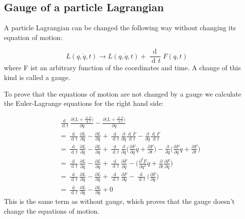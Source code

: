 \documentclass{article}
\DeclareMathOperator{\dd}{d\!}
\begin{document}
\subsection{Gauge of a particle Lagrangian}
A particle Lagrangian can be changed the following way without changing its equation of motion:

\begin{equation}
  L(q,\dot{q}, t) \rightarrow L(q,\dot{q}, t) + \frac{\dd}{ \dd t} F(q,t)
\end{equation}
where F ist an arbitrary function of the coordinates and time.
A change of this kind is called a gauge.

To prove that the equations of motion are not changed by a gauge we calculate the Euler-Lagrange equations for the right hand side:

\begin{align}
  & \frac{\dd}{\dd t} \frac{\partial \big(L + \frac{\dd F}{\dd t}\big)}{\partial \dot{q}} - \frac{\partial \big(L + \frac{\dd F}{\dd t}\big)}{\partial q} \nonumber \\
  & = \frac{\dd}{\dd t} \frac{\partial L}{\partial \dot{q}} - \frac{\partial L }{\partial q}
  + \frac{\dd}{\dd t} \frac{\partial}{\partial \dot{q}} \frac{\dd F}{\dd t}  - \frac{\partial}{\partial q} \frac{\dd F}{\dd t} \nonumber \\
  & = \frac{\dd}{\dd t} \frac{\partial L}{\partial \dot{q}} - \frac{\partial L }{\partial q}
  + \frac{\dd}{\dd t} \frac{\partial}{\partial \dot{q}} \bigg( \frac{\partial F}{\partial q} \dot{q} + \frac{\partial F}{\partial t} \bigg)
  - \frac{\partial}{\partial q} \bigg( \frac{\partial F}{\partial q} \dot{q} + \frac{\partial F}{\partial t} \bigg) \nonumber \\
  & = \frac{\dd}{\dd t} \frac{\partial L}{\partial \dot{q}} - \frac{\partial L }{\partial q}
  + \frac{\dd}{\dd t} \frac{\partial F}{\partial q}
  - \bigg(\frac{\partial^2 F}{\partial q^2} \dot{q} + \frac{\partial }{\partial t} \frac{\partial F}{\partial q} \bigg) \nonumber \\
  & = \frac{\dd}{\dd t} \frac{\partial L}{\partial \dot{q}} - \frac{\partial L }{\partial q}
  + \frac{\dd}{\dd t} \frac{\partial F}{\partial q}
  - \frac{\dd}{\dd t} \bigg(\frac{\partial F}{\partial q} \bigg) \nonumber \\
  & = \frac{\dd}{\dd t} \frac{\partial L}{\partial \dot{q}} - \frac{\partial L }{\partial q} + 0
\end{align}
This is the same term as without gauge, which proves that the gauge doesn't change the equations of motion.
\end{document}
